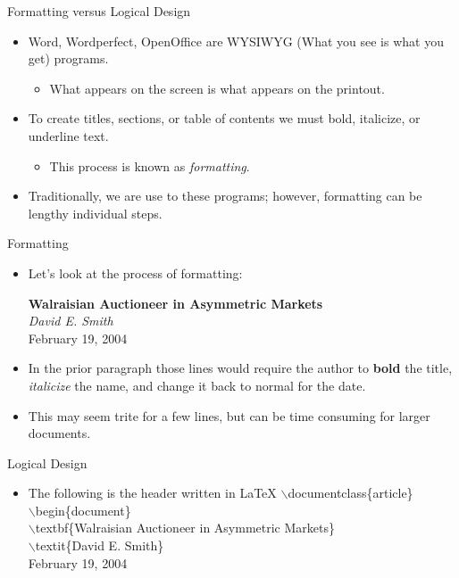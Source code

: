 \documentclass[pdf]{prosper}
\begin{document}
\begin{slide}{Formatting versus Logical Design}
	\begin{itemize}
		\item Word, Wordperfect, OpenOffice are WYSIWYG (What you see is what you get) programs.
			\begin{itemize}
				\item What appears on the screen is what appears on the printout.
			\end{itemize}
		\item To create titles, sections, or table of contents we must bold, italicize, or underline text.
			\begin{itemize}
				\item This process is known as \textit{formatting}.
			\end{itemize}
		\item Traditionally, we are use to these programs; however, formatting can be lengthy individual steps.
	\end{itemize}
\end{slide}
\begin{slide}{Formatting}
	\begin{itemize}
		\item	Let's look at the process of formatting:
	\begin{center}
		\textbf{Walraisian Auctioneer in Asymmetric Markets}\\
		\textit{David E. Smith}\\
		February 19, 2004\\
	\end{center}
		\item In the prior paragraph those lines would require the author to \textbf{bold} the title, \textit{italicize} the name, and change it back to normal for the date.
		\item This may seem trite for a few lines, but can be time consuming for larger documents.
	\end{itemize}
\end{slide}
\begin{slide}{Logical Design}
	\begin{itemize}
		\item The following is the header written in \LaTeX
		$\backslash$documentclass\{article\}\\
		$\backslash$begin\{document\}\\
		$\backslash$textbf\{Walraisian Auctioneer in Asymmetric Markets\}\\
		$\backslash$textit\{David E. Smith\}\\
		February 19, 2004
	\end{itemize}
\end{slide}
\end{document}
